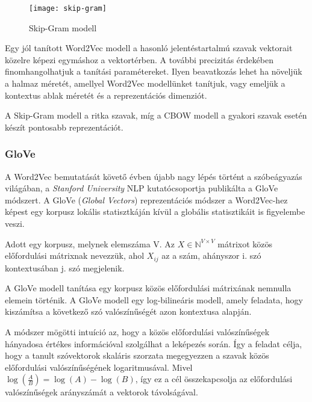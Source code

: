 \begin{figure}[H]
	\centering
	\texttt{[image: skip-gram]}
	\caption{Skip-Gram modell}
\end{figure}

Egy jól tanított Word2Vec modell a hasonló jelentéstartalmú szavak vektorait közelre képezi egymáshoz a vektortérben. 
A további precizitás érdekében finomhangolhatjuk a tanítási paramétereket. Ilyen beavatkozás lehet ha növeljük a halmaz méretét, amellyel Word2Vec modellünket tanítjuk, vagy emeljük a kontextus ablak méretét és a reprezentációs dimenziót.

\begin{note}
	A Skip-Gram modell a ritka szavak, míg a CBOW modell a gyakori szavak esetén készít pontosabb reprezentációt.
\end{note}


\subsubsection{GloVe}
A Word2Vec bemutatását követő évben újabb nagy lépés történt a szóbeágyazás világában, a \textit{Stanford University} NLP kutatócsoportja publikálta a GloVe módszert.
A GloVe (\textit{Global Vectors}) \cite{pennington2014glove} reprezentációs módszer a Word2Vec-hez képest egy korpusz lokális statisztkáján kívül a globális statisztikáit is figyelembe veszi. 

\begin{definition}
	Adott egy korpusz, melynek elemszáma V. Az $X \in \mathbb{N}^{V \times V}$ mátrixot közös előfordulási mátrixnak nevezzük, ahol $X_{ij}$ az a szám, ahányszor i. szó kontextusában j. szó megjelenik.  
\end{definition}

A GloVe modell tanítása egy korpusz közös előfordulási mátrixának nemnulla elemein történik. A GloVe modell egy log-bilineáris modell, amely feladata, hogy kiszámítsa a következő szó valószínűségét azon kontextusa alapján.

A módszer mögötti intuíció az, hogy a közös előfordulási valószínűségek hányadosa értékes információval szolgálhat a leképezés során. Így a feladat célja, hogy a tanult szóvektorok skaláris szorzata megegyezzen a szavak közös előfordulási valószínűségének logaritmusával. Mivel $\log \left( \frac{A}{B} \right) = \log \left( A \right) - \log \left( B \right)$, így ez a cél összekapcsolja az előfordulási valószínűségek arányszámát a vektorok távolságával.

